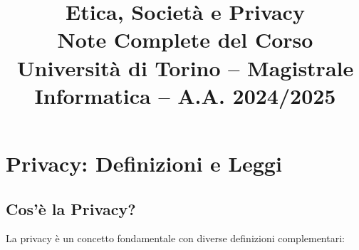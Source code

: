 \documentclass[a4paper,11pt]{article}
\title{\textbf{Etica, Societ\`{a} e Privacy}\\[0.5em]
\large Note Complete del Corso\\[0.3em]
\normalsize Universit\`{a} di Torino -- Magistrale Informatica -- A.A. 2024/2025}
\author{}
\date{}
\begin{document}
\maketitle
\tableofcontents
\newpage

\section{Privacy: Definizioni e Leggi}

\subsection{Cos'\`{e} la Privacy?}

La privacy \`{e} un concetto fondamentale con diverse definizioni complementari:
\end{document}
